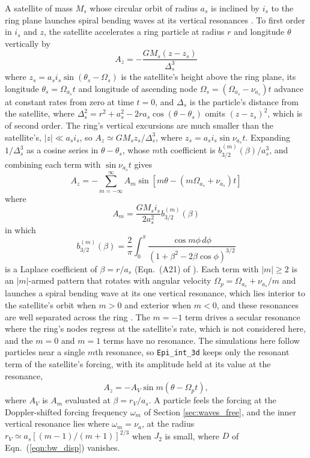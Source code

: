 \documentclass[twocolumn]{aastex702}
\newcommand{\code}[1]{\texttt{#1}}   %
\begin{document}
A satellite of mass $M_s$ whose circular orbit of radius $a_s$ is inclined by $i_s$ to the ring plane
launches spiral bending waves at its vertical resonances \citep{SCL83, S84}. To first order in $i_s$ and $z$, the
satellite accelerates a ring particle at radius $r$ and longitude $\theta$ vertically by
\begin{equation}
    \label{eqn:vres_full}
    A_z = -\frac{GM_s(z - z_s)}{\Delta_s^3}
\end{equation}
where $z_s = a_si_s\sin(\theta_s - \Omega_s)$ is the satellite's height above the ring plane, its longitude
$\theta_s = \Omega_{a_s}t$ and longitude of ascending node $\Omega_s = (\Omega_{a_s} - \nu_{a_s})t$ advance at
constant rates from zero at time $t = 0$, and $\Delta_s$ is the particle's distance from the satellite, where
$\Delta_s^2 = r^2 + a_s^2 - 2ra_s\cos(\theta - \theta_s)$ omits $(z - z_s)^2$, which is of second order.
The ring's vertical excursions are much smaller than the satellite's, $|z| \ll a_si_s$, so
$A_z \simeq GM_sz_s/\Delta_s^3$, where $z_s = a_si_s\sin\nu_{a_s}t$. Expanding $1/\Delta_s^3$ as a cosine series in
$\theta - \theta_s$, whose $m$th coefficient is $b_{3/2}^{(m)}(\beta)/a_s^3$, and combining each term with
$\sin\nu_{a_s}t$ gives
\begin{equation}
    \label{eqn:vres_series}
    A_z = -\sum_{m=-\infty}^\infty A_m\sin[m\theta - (m\Omega_{a_s} + \nu_{a_s})t]
\end{equation}
where
\begin{equation}
    \label{eqn:vres_AV}
    A_m = \frac{GM_si_s}{2a_s^2}b_{3/2}^{(m)}(\beta)
\end{equation}
in which
\begin{equation}
    \label{eqn:laplace_b}
    b_{3/2}^{(m)}(\beta) = \frac{2}{\pi}\int_0^\pi\frac{\cos m\phi\,d\phi}{(1 + \beta^2 - 2\beta\cos\phi)^{3/2}}
\end{equation}
is a Laplace coefficient of $\beta = r/a_s$ (Eqn.\ (A21) of \citealt{S84}). Each
term with $|m| \ge 2$ is an $|m|$-armed pattern that rotates with angular velocity
$\Omega_p = \Omega_{a_s} + \nu_{a_s}/m$ and launches a spiral bending wave at its one vertical resonance, which
lies interior to the satellite's orbit when $m > 0$ and exterior when $m < 0$, and these resonances are well
separated across the ring \citep{S84}. The $m = -1$ term drives a secular resonance where the ring's nodes
regress at the satellite's rate, which is not considered here, and the $m = 0$ and $m = 1$ terms have no resonance. The simulations here follow particles near a single $m$th resonance, so
\code{Epi\_int\_3d} keeps only the resonant term of the satellite's forcing, with its amplitude held at its value at
the resonance,
\begin{equation}
    \label{eqn:vres_force}
    A_z = -A_V\sin m(\theta - \Omega_pt),
\end{equation}
where $A_V$ is $A_m$ evaluated at $\beta = r_V/a_s$. A particle feels the forcing at the Doppler-shifted forcing
frequency $\omega_m$ of Section \ref{sec:waves_free}, and the inner vertical resonance lies where $\omega_m = \nu_a$, at the
radius $r_V \simeq a_s[(m - 1)/(m + 1)]^{2/3}$ when $J_2$ is small, where $D$ of
Eqn.\ (\ref{eqn:bw_disp}) vanishes.
\end{document}
